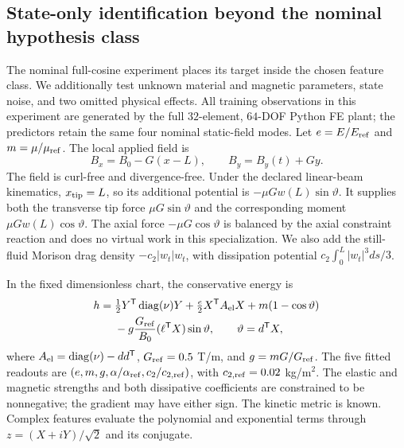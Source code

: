 \subsection{State-only identification beyond the nominal hypothesis class}
\label{sec:robustness-newphysics}
The nominal full-cosine experiment places its target inside the chosen
feature class. We additionally test unknown material and magnetic
parameters, state noise, and two omitted physical effects. All training
observations in this experiment are generated by the full $32$-element,
$64$-DOF Python FE plant; the predictors retain the same four nominal
static-field modes. Let $e=E/E_{\rm ref}$ and $m=\mu/\mu_{\rm ref}$.
The local applied field is
\begin{equation}
 B_x=B_0-G(x-L),\qquad B_y=B_y(t)+Gy.
 \label{eq:robust-gradientfield}
\end{equation}
The field is curl-free and divergence-free. Under the declared
linear-beam kinematics, $x_{\rm tip}=L$, so its additional potential is
$-\mu G w(L)\sin\vartheta$. It supplies both the transverse tip force
$\mu G\sin\vartheta$ and the corresponding moment
$\mu G w(L)\cos\vartheta$. The axial force $-\mu G\cos\vartheta$ is
balanced by the axial constraint reaction and does no virtual work in
this specialization. We also add the still-fluid Morison drag density
$-c_2|w_t|w_t$, with dissipation potential
$c_2\int_0^L|w_t|^3ds/3$.

In the fixed dimensionless chart, the conservative energy is
\begin{align}
 h={}&\tfrac12Y^{\mathsf T}\operatorname{diag}(\nu)Y
 +\tfrac e2 X^{\mathsf T}A_{\rm el}X
 +m(1-\cos\vartheta)\nonumber\\
 &-g\frac{G_{\rm ref}}{B_0}(\ell^{\mathsf T}X)\sin\vartheta,
 \qquad \vartheta=d^{\mathsf T}X,
 \label{eq:robust-energy}
\end{align}
where $A_{\rm el}=\operatorname{diag}(\nu)-dd^{\mathsf T}$,
$G_{\rm ref}=0.5$ T/m, and $g=mG/G_{\rm ref}$.
The five fitted readouts are $(e,m,g,\alpha/\alpha_{\rm ref},
c_2/c_{2,\rm ref})$, with $c_{2,\rm ref}=0.02$ kg/m$^2$.
The elastic and magnetic strengths and both dissipative coefficients are
constrained to be nonnegative; the gradient may have either sign.
The kinetic metric is known. Complex features evaluate the polynomial
and exponential terms through $z=(X+iY)/\sqrt2$ and its conjugate.

